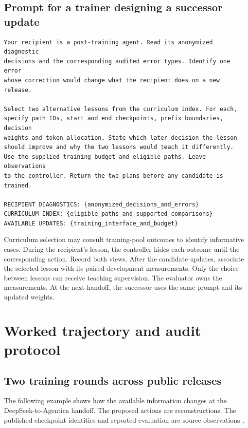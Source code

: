 \subsection{Prompt for a trainer designing a successor update}

\begin{verbatim}
Your recipient is a post-training agent. Read its anonymized diagnostic
decisions and the corresponding audited error types. Identify one error
whose correction would change what the recipient does on a new release.

Select two alternative lessons from the curriculum index. For each,
specify path IDs, start and end checkpoints, prefix boundaries, decision
weights and token allocation. State which later decision the lesson
should improve and why the two lessons would teach it differently.
Use the supplied training budget and eligible paths. Leave observations
to the controller. Return the two plans before any candidate is trained.

RECIPIENT DIAGNOSTICS: {anonymized_decisions_and_errors}
CURRICULUM INDEX: {eligible_paths_and_supported_comparisons}
AVAILABLE UPDATES: {training_interface_and_budget}
\end{verbatim}

Curriculum selection may consult training-pool outcomes to identify informative cases. During the recipient's lesson, the controller hides each outcome until the corresponding action. Record both views. After the candidate updates, associate the selected lesson with its paired development measurements. Only the choice between lessons can receive teaching supervision. The evaluator owns the measurements. At the next handoff, the successor uses the same prompt and its updated weights.

\section{Worked trajectory and audit protocol}
\label{app:worked}

\subsection{Two training rounds across public releases}

The following example shows how the available information changes at the DeepSeek-to-Agentica handoff. The proposed actions are reconstructions. The published checkpoint identities and reported evaluation are source observations \citep{qwen2024math,deepseek2025card,agentica2025deepscaler}.

